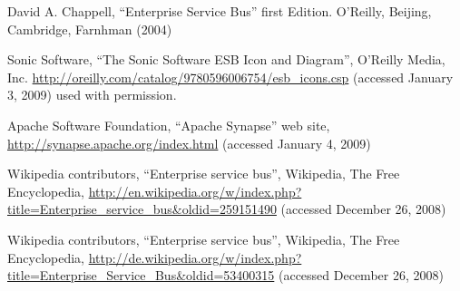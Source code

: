 %
%

\begin{thebibliography}{}

 David A. Chappell,
``Enterprise Service Bus'' first Edition. 
O'Reilly, Beijing, Cambridge, Farnhman (2004)

Sonic Software,
``The Sonic Software ESB Icon and Diagram'',
O'Reilly Media, Inc.
\url{http://oreilly.com/catalog/9780596006754/esb_icons.csp} (accessed January
3, 2009)
used with permission.

Apache Software Foundation, 
``Apache Synapse'' web site,
\url{http://synapse.apache.org/index.html} (accessed January 4, 2009)

Wikipedia contributors,
``Enterprise service bus'', Wikipedia, The Free
Encyclopedia,
\url{http://en.wikipedia.org/w/index.php?title=Enterprise_service_bus&oldid=259151490}
(accessed December 26, 2008)

Wikipedia contributors,
``Enterprise service bus'',
Wikipedia, The Free Encyclopedia,
\url{http://de.wikipedia.org/w/index.php?title=Enterprise_Service_Bus&oldid=53400315}
(accessed December 26, 2008)

\end{thebibliography}

